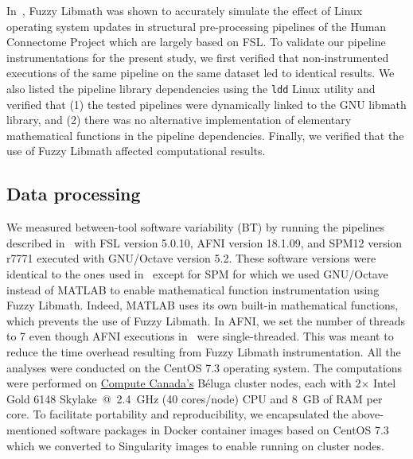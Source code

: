 \documentclass[11pt,onecolumn]{article}
\begin{document}
In~\cite{salari2021accurate}, Fuzzy Libmath was shown to accurately
simulate the effect of Linux operating system updates in structural
pre-processing pipelines of the Human Connectome Project which are largely based on FSL.
To validate our pipeline instrumentations for the present study, we first verified that non-instrumented
executions of the same pipeline on the same dataset led to identical
results. We also listed the pipeline
library dependencies using the \texttt{ldd} Linux utility and verified that
(1) the tested pipelines were dynamically linked to the GNU libmath library, and
(2) there was no alternative implementation of elementary mathematical functions in the pipeline dependencies.
Finally, we verified that the use of Fuzzy Libmath affected computational results.

\subsection{Data processing}

We measured between-tool software variability (BT) by running the pipelines
described in~\cite{bowring2019exploring} with FSL version 5.0.10, AFNI
version 18.1.09, and SPM12 version r7771 executed with GNU/Octave version
5.2. These software versions were identical to the ones used 
in~\cite{bowring2019exploring} except for SPM for which we used GNU/Octave
instead of MATLAB to enable mathematical function instrumentation using
Fuzzy Libmath. Indeed, MATLAB uses its own built-in mathematical functions,
which prevents the use of Fuzzy Libmath. In AFNI, we set the number of
threads to 7 even though AFNI executions
in~\cite{bowring2019exploring} were single-threaded. This was meant to
reduce the time overhead resulting from Fuzzy Libmath instrumentation.
All the analyses were conducted on the CentOS 7.3 operating system. The
computations were performed on \href{https://www.computecanada.ca}{Compute
  Canada's} Béluga cluster nodes, each with 2$\times$ Intel Gold 6148 Skylake~@~2.4~GHz
(40 cores/node) CPU and 8~GB of RAM per core. To facilitate portability and reproducibility,
we encapsulated the
above-mentioned software packages in Docker container images based on CentOS 7.3
which we converted to Singularity images to enable running on cluster nodes.
\end{document}
